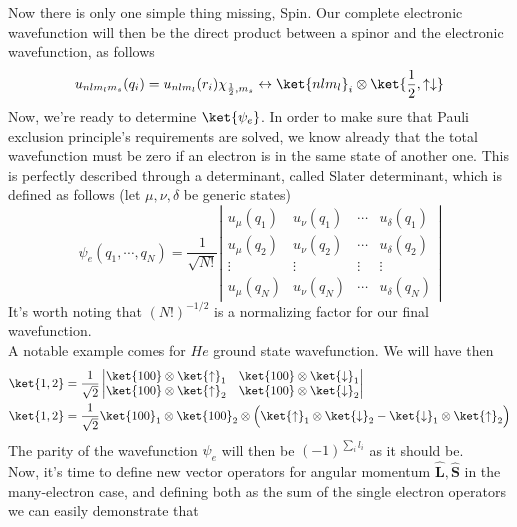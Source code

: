 \documentclass[a4paper, 11pt]{book}
\renewcommand{\vec}[1]{\mathbf{#1}}
\newcommand{\1}{\opr{\mathds{1}}}
\newcommand{\opr}[1]{\hat{#1}}
\newcommand{\vecopr}[1]{\opr{\vec{#1}}}
\newcommand{\up}{\uparrow}
\newcommand{\down}{\downarrow}
\theoremstyle{plain}
\begin{document}
	Now there is only one simple thing missing, Spin. Our complete electronic wavefunction will then be the direct product between a spinor and the electronic wavefunction, as follows
	\begin{equation}
		u_{nlm_lm_s}(q_i)=u_{nlm_l}(r_i)\chi_{\frac{1}{2},m_s}\leftrightarrow\ket{nlm_l}_i\otimes\ket{\frac{1}{2},\up\down}
		\label{eq:spinelectronwfmanyelectrons}
	\end{equation}
	Now, we're ready to determine $\ket{\psi_e}$. In order to make sure that Pauli exclusion principle's requirements are solved, we know already that the total wavefunction must be zero if an electron is in the same state of another one. This is perfectly described through a determinant, called Slater determinant, which is defined as follows (let $\mu,\nu,\delta$ be generic states)
	\begin{equation}
		\psi_e(q_1,\cdots,q_N)=\frac{1}{\sqrt{N!}}\left|\begin{matrix}u_{\mu}(q_1)&u_{\nu}(q_1)&\cdots&u_{\delta}(q_1)\\u_\mu(q_2)&u_\nu(q_2)&\cdots&u_\delta(q_2)\\\vdots&\vdots&\vdots&\vdots\\u_\mu(q_N)&u_\nu(q_N)&\cdots&u_\delta(q_N)\end{matrix}\right|
		\label{eq:slaterdeterminantatomic}
	\end{equation}
	It's worth noting that $(N!)^{-1/2}$ is a normalizing factor for our final wavefunction.\\
	A notable example comes for $He$ ground state wavefunction. We will have then
	\begin{equation}
		\begin{aligned}
			\ket{1,2}&=\frac{1}{\sqrt{2}}\left|\begin{matrix}\ket{100}\otimes\ket{\up}_1&\ket{100}\otimes\ket{\down}_1\\\ket{100}\otimes\ket{\up}_2&\ket{100}\otimes\ket{\down}_2\end{matrix}\right|\\
			\ket{1,2}&=\frac{1}{\sqrt{2}}\ket{100}_1\otimes\ket{100}_2\otimes\Big( \ket{\up}_1\otimes\ket{\down}_2-\ket{\down}_1\otimes\ket{\up}_2 \Big)
		\end{aligned}
		\label{eq:slaterhelium}
	\end{equation}
	The parity of the wavefunction $\psi_e$ will then be $(-1)^{\sum_il_i}$ as it should be.\\
	Now, it's time to define new vector operators for angular momentum $\vecopr{L},\vecopr{S}$ in the many-electron case, and defining both as the sum of the single electron operators we can easily demonstrate that
\end{document}
